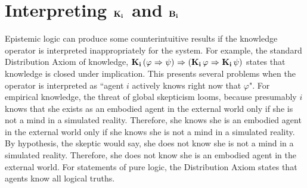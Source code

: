 \section{Interpreting $\mathbf{K}_{\mathbf{i}}\,$ and $\mathbf{B}_{\mathbf{i}}\,$}
Epistemic logic can produce some counterintuitive results if the knowledge operator is interpreted inappropriately for the system. For example, the standard Distribution Axiom of knowledge, $\mathbf{K}_{\mathbf{i}}\,(\varphi {\ \Rightarrow \ } \psi) {\ \Rightarrow \ } (\mathbf{K}_{\mathbf{i}}\,\varphi {\ \Rightarrow \ } \mathbf{K}_{\mathbf{i}}\,\psi)$ states that knowledge is closed under implication. This presents several problems when the operator is interpreted as ``agent $i$ actively knows right now that $\varphi$". For empirical knowledge, the threat of global skepticism looms, because presumably $i$ knows that she exists as an embodied agent in the external world only if she is not a mind in a simulated reality. Therefore, she knows she is an embodied agent in the external world only if she knows she is not a mind in a simulated reality. By hypothesis, the skeptic would say, she does not know she is not a mind in a simulated reality. Therefore, she does not know she is an embodied agent in the external world. For statements of pure logic, the Distribution Axiom states that agents know all logical truths. 

